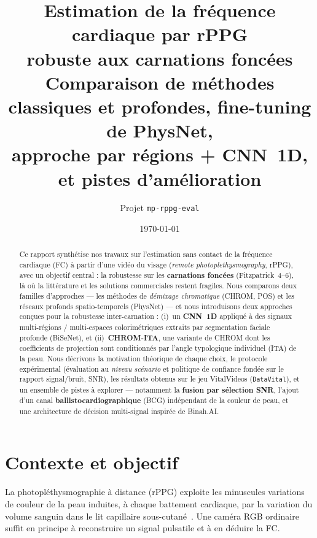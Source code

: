 \documentclass[11pt,a4paper]{article}
\title{\textbf{Estimation de la fréquence cardiaque par rPPG\\
robuste aux carnations foncées}\\[4pt]
\large Comparaison de méthodes classiques et profondes, fine-tuning de PhysNet,\\
approche par régions + CNN~1D, et pistes d'amélioration}
\author{Projet \texttt{mp-rppg-eval}}
\date{\today}
\begin{document}
\maketitle

\begin{abstract}
\noindent
Ce rapport synthétise nos travaux sur l'estimation sans contact de la fréquence
cardiaque (FC) à partir d'une vidéo du visage (\emph{remote photoplethysmography},
rPPG), avec un objectif central : la robustesse sur les \textbf{carnations foncées}
(Fitzpatrick~4--6), là où la littérature et les solutions commerciales restent
fragiles. Nous comparons deux familles d'approches --- les méthodes de
\emph{démixage chromatique} (CHROM, POS) et les réseaux profonds spatio-temporels
(PhysNet) --- et nous introduisons deux approches conçues pour la robustesse
inter-carnation : (i)~un \textbf{CNN~1D} appliqué à des signaux multi-régions /
multi-espaces colorimétriques extraits par segmentation faciale profonde (BiSeNet),
et (ii)~\textbf{CHROM-ITA}, une variante de CHROM dont les coefficients de
projection sont conditionnés par l'angle typologique individuel (ITA) de la peau.
Nous décrivons la motivation théorique de chaque choix, le protocole expérimental
(évaluation au \emph{niveau scénario} et politique de confiance fondée sur le
rapport signal/bruit, SNR), les résultats obtenus sur le jeu VitalVideos
(\texttt{DataVital}), et un ensemble de pistes à explorer --- notamment la
\textbf{fusion par sélection SNR}, l'ajout d'un canal \textbf{ballistocardiographique}
(BCG) indépendant de la couleur de peau, et une architecture de décision multi-signal
inspirée de Binah.AI.
\end{abstract}

\tableofcontents
\bigskip

\section{Contexte et objectif}

La photopléthysmographie à distance (rPPG) exploite les minuscules variations de
couleur de la peau induites, à chaque battement cardiaque, par la variation du
volume sanguin dans le lit capillaire sous-cutané~\cite{verkruysse2008,
poh2010}. Une caméra RGB ordinaire suffit en principe à reconstruire un signal
pulsatile et à en déduire la FC.
\end{document}
